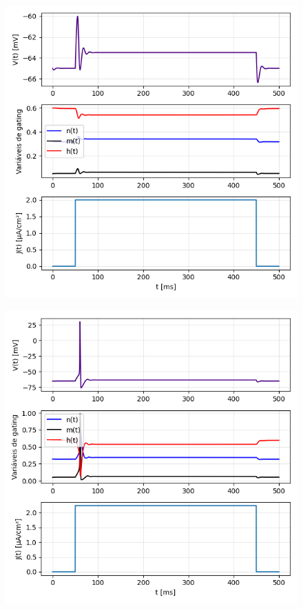 \documentclass[english,11pt,a4paper]{article}
\begin{document}
			\begin{figure}[H]
		\centering
		\begin{minipage}{0.49\textwidth}
			\centering
			\includegraphics[width=\linewidth]{../figures/ex_4_1.png}
			\captionsetup{justification=centering, labelformat=empty}
			\label{}
		\end{minipage}
		\hfill
		\begin{minipage}{0.49\textwidth}
			\centering
			\includegraphics[width=\linewidth]{../figures/ex_4_2.png}

\end{minipage}
\end{figure}
\end{document}

